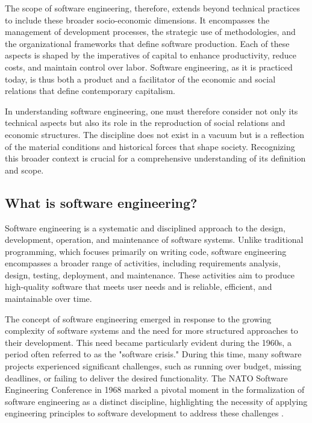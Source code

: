 \begin{refsection}
The scope of software engineering, therefore, extends beyond technical practices to include these broader socio-economic dimensions. It encompasses the management of development processes, the strategic use of methodologies, and the organizational frameworks that define software production. Each of these aspects is shaped by the imperatives of capital to enhance productivity, reduce costs, and maintain control over labor. Software engineering, as it is practiced today, is thus both a product and a facilitator of the economic and social relations that define contemporary capitalism.

In understanding software engineering, one must therefore consider not only its technical aspects but also its role in the reproduction of social relations and economic structures. The discipline does not exist in a vacuum but is a reflection of the material conditions and historical forces that shape society. Recognizing this broader context is crucial for a comprehensive understanding of its definition and scope.

\subsection{What is software engineering?}

Software engineering is a systematic and disciplined approach to the design, development, operation, and maintenance of software systems. Unlike traditional programming, which focuses primarily on writing code, software engineering encompasses a broader range of activities, including requirements analysis, design, testing, deployment, and maintenance. These activities aim to produce high-quality software that meets user needs and is reliable, efficient, and maintainable over time.

The concept of software engineering emerged in response to the growing complexity of software systems and the need for more structured approaches to their development. This need became particularly evident during the 1960s, a period often referred to as the "software crisis." During this time, many software projects experienced significant challenges, such as running over budget, missing deadlines, or failing to deliver the desired functionality. The NATO Software Engineering Conference in 1968 marked a pivotal moment in the formalization of software engineering as a distinct discipline, highlighting the necessity of applying engineering principles to software development to address these challenges \cite[pp.~45-50]{bauer1968nato}.


\end{refsection}
